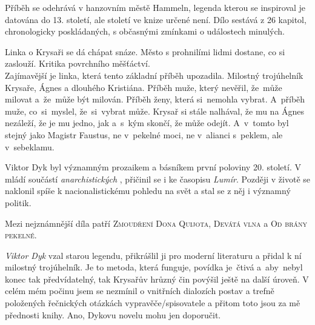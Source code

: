 \documentclass{extarticle} %
\begin{document}
\noindent 
Příběh se odehrává v hanzovním městě Hammeln, legenda kterou se  inspiroval je datována do 13. století, ale století ve knize určené není.
Dílo sestává z 26 kapitol, chronologicky poskládaných, s občasnými zmínkami o událostech minulých.

\noindent 
Linka o Krysaři se dá chápat snáze.
Město s prohnilími lidmi dostane, co si zaslouží.
Kritika povrchního měšťáctví.\\
Zajímavější je linka, která tento základní příběh upozadila.
Milostný trojúhelník Krysaře, Ágnes a dlouhého Kristiána.
Příběh muže, který nevěřil, že~může milovat a~že~může být milován.
Příběh ženy, která si~nemohla vybrat.
A~příběh muže, co~si~myslel, že~si~vybrat může.
Krysař si stále nalhával, že mu na Ágnes nezáleží, že je mu jedno, jak a~s~kým skončí, že může odejít.
A~v~tomto byl stejný jako Magistr Faustus, ne v~pekelné moci, ne v~alianci s~peklem, ale v~sebeklamu.






\noindent Viktor Dyk byl významným prozaikem a básníkem první poloviny 20. století.
V mládí součástí \textit{anarchistických }, přičinil se i ke časopisu \textit{Lumír}.
Později v životě se naklonil spíše k nacionalistickému pohledu na svět a stal se z něj i významný politik.


\noindent 
Mezi nejznámnější díla patří \textsc{Zmoudření Dona Quijota}, \textsc{Devátá vlna} a \textsc{Od brány pekelné}.






\noindent 
\textit{Viktor Dyk} vzal starou legendu, přikrášlil ji pro moderní literaturu a přidal k ní milostný trojúhelník.
Je to metoda, která funguje, povídka je~čtivá a~aby~nebyl konec tak předvídatelný, tak Krysařův hrůzný čin povýšil ještě na další úroveň.
V celém mém počinu jsem se nezmínil o vnitřních dialozích postav a trefně položených řečnických otázkách vypravěče/spisovatele a přitom toto jsou za mě přednosti knihy.
Ano, Dykovu novelu mohu jen doporučit.
\end{document}
